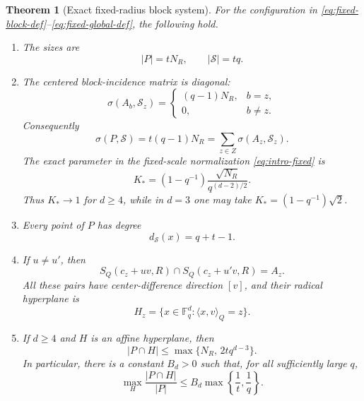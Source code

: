 \documentclass[11pt,letterpaper]{amsart}
\newtheorem{theorem}{Theorem}[section]
\theoremstyle{definition}
\theoremstyle{remark}
\newcommand{\1}{\mathbf 1}
\newcommand{\ip}[2]{\langle #1,#2\rangle_Q}
\begin{document}
\begin{theorem}[Exact fixed-radius block system]\label{thm:fixed-block}
For the configuration in \eqref{eq:fixed-block-def}--\eqref{eq:fixed-global-def}, the following hold.
\begin{enumerate}[label=\textup{(\arabic*)}]
\item The sizes are
\begin{equation}\label{eq:fixed-sizes}
 |P|=tN_R,
 \qquad
 |\mathcal S|=tq.
\end{equation}
\item The centered block-incidence matrix is diagonal:
\begin{equation}\label{eq:fixed-cross}
 \sigma(A_b,\mathcal S_z)=
 \begin{cases}
  (q-1)N_R,&b=z,\\
  0,&b\ne z.
 \end{cases}
\end{equation}
Consequently
\begin{equation}\label{eq:fixed-sigma}
 \sigma(P,\mathcal S)=t(q-1)N_R
 =\sum_{z\in Z}\sigma(A_z,\mathcal S_z).
\end{equation}
The exact parameter in the fixed-scale normalization \eqref{eq:intro-fixed} is
\begin{equation}\label{eq:fixed-K}
 K_*=(1-q^{-1})\frac{\sqrt{N_R}}{q^{(d-2)/2}}.
\end{equation}
Thus $K_*\to1$ for $d\ge4$, while in $d=3$ one may take
$K_*=(1-q^{-1})\sqrt2$.
\item Every point of $P$ has degree
\begin{equation}\label{eq:fixed-degree}
 d_{\mathcal S}(x)=q+t-1.
\end{equation}
\item If $u\ne u'$, then
\begin{equation}\label{eq:fixed-common-section}
 S_Q(c_z+uv,R)\cap S_Q(c_z+u'v,R)=A_z.
\end{equation}
All these pairs have center-difference direction $[v]$, and their radical hyperplane is
\begin{equation}\label{eq:fixed-Hz}
 H_z=\{x\in\mathbb F_q^d:\ip{x}{v}=z\}.
\end{equation}
\item If $d\ge4$ and $H$ is an affine hyperplane, then
\begin{equation}\label{eq:fixed-hyperplane-exact}
 |P\cap H|\le
 \max\{N_R,\,2tq^{d-3}\}.
\end{equation}
In particular, there is a constant $B_d>0$ such that, for all sufficiently large $q$,
\begin{equation}\label{eq:fixed-hyperplane-ratio}
 \max_H\frac{|P\cap H|}{|P|}
 \le B_d\max\left\{\frac1t,\frac1q\right\}.
\end{equation}
\end{enumerate}
\end{theorem}
\end{document}
